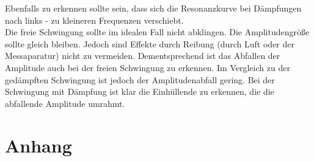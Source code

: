 \documentclass[12pt,a4paper,]{scrreprt}
\begin{document}
    Ebenfalls zu erkennen sollte sein, dass sich die Resonanzkurve bei Dämpfungen nach links - zu kleineren Frequenzen verschiebt.\\
    Die freie Schwingung sollte im idealen Fall nicht abklingen. Die Amplitudengröße sollte gleich bleiben. Jedoch sind Effekte durch Reibung (durch Luft oder der Messaparatur) nicht zu vermeiden. Dementsprechend ist das Abfallen der Amplitude auch bei der freien Schwingung zu erkennen. Im Vergleich zu der gedämpften Schwingung ist jedoch der Amplitudenabfall gering. Bei der Schwingung mit Dämpfung ist klar die Einhüllende zu erkennen, die die abfallende Amplitude umrahmt.
	\pagebreak
    


\chapter{Anhang}
\end{document}
